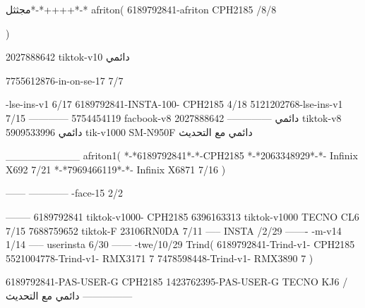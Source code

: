 مجثثل*-*++++*-*
afriton(
6189792841-afriton CPH2185  /8/8

)

2027888642 tiktok-v10
دائمي

7755612876-in-on-se-17 7/7

-lse-ins-v1 6/17
6189792841-INSTA-100- CPH2185 4/18
5121202768-lse-ins-v1 7/15
------------
5754454119 facbook-v8
دائمي
--------------
2027888642 tiktok-v8
دائمي
5909533996 tik-v1000  SM-N950F
دائمي مع التحديث

__________
afriton1(
*-*6189792841*-*-CPH2185
*-*2063348929*-*-  Infinix X692  7/21
*-*7969466119*-*-  Infinix X6871  7/16
)


------
------------
-face-15 2/2

--------
6189792841 tiktok-v1000- CPH2185 
6396163313 tiktok-v1000 TECNO CL6  7/15
7688759652 tiktok-F 23106RN0DA  7/11
-----
 INSTA /2/29
-------
-m-v14 1/14
-----
userinsta 6/30
------
-twe/10/29
Trind(
6189792841-Trind-v1- CPH2185 
5521004778-Trind-v1- RMX3171 7
7478598448-Trind-v1- RMX3890 7
)


6189792841-PAS-USER-G CPH2185 
1423762395-PAS-USER-G TECNO KJ6  /دائمي مع التحديث
    ---------------
